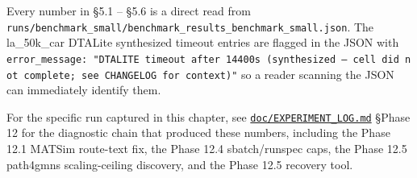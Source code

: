Every number in §5.1 -- §5.6 is a direct read from
\texttt{runs/benchmark\_small/benchmark\_results\_benchmark\_small.json}.
The la\_50k\_car DTALite synthesized timeout entries are flagged in the
JSON with
\texttt{error\_message:\ "DTALITE\ timeout\ after\ 14400s\ (synthesized\ —\ cell\ did\ not\ complete;\ see\ CHANGELOG\ for\ context)"}
so a reader scanning the JSON can immediately identify them.

For the specific run captured in this chapter, see
\href{../EXPERIMENT_LOG.md}{\texttt{doc/EXPERIMENT\_LOG.md}} §Phase 12
for the diagnostic chain that produced these numbers, including the
Phase 12.1 MATSim route-text fix, the Phase 12.4 sbatch/runspec caps,
the Phase 12.5 path4gmns scaling-ceiling discovery, and the Phase 12.5
recovery tool.
